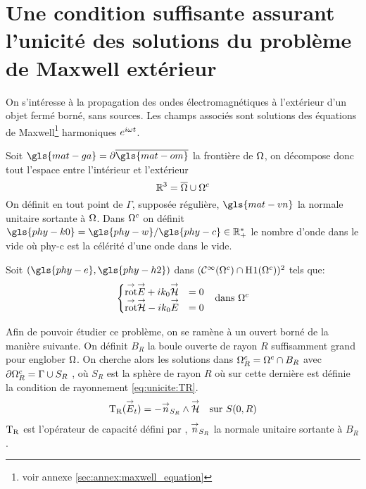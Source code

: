 \section[Une CSU des solutions du problème de Maxwell extérieur]{Une condition suffisante assurant l'unicité des solutions du problème de Maxwell extérieur}

  On s’intéresse à la propagation des ondes électromagnétiques à l'extérieur d'un objet fermé borné, sans sources. Les champs associés sont solutions des équations de Maxwell\footnote{voir annexe \ref{sec:annex:maxwell_equation}} harmoniques \(e^{i\w t}\).

  Soit \(\gls{mat-ga}=\partial\overline{\gls{mat-om}}\) la frontière de \(\OO\), on décompose donc tout l'espace entre l'intérieur et l'extérieur 
  \[
    \RR^3 = \overline{\OO}\cup{\OO}^c
  \]
  On définit en tout point de \(\Gamma\), supposée régulière, \(\gls{mat-vn}\) la normale unitaire sortante à \(\OO\).
  Dans \(\OO^c\) on définit \(\gls{phy-k0}=\gls{phy-w} / \gls{phy-c} \in \RR_+^*\) le nombre d'onde dans le vide où \gls{phy-c} est la célérité d'une onde dans le vide.

  Soit \((\gls{phy-e},\gls{phy-h2})\) dans \((\mathcal{C}^\infty(\OO^c)\cap\Sobolev[1](\OO^c))^2\) tels que:
  \begin{align}
  \left\lbrace
    \begin{matrix}
      \trot \vE + i k_0 \vH &= 0
      \\
      \trot \vH - i k_0 \vE &= 0
    \end{matrix}
    \right. && \text{dans \(\OO^c\)}
    \label{eq:unicite:maxwell_ext}
  \end{align}


  Afin de pouvoir étudier ce problème, on se ramène à un ouvert borné de la manière suivante. On définit \(B_R\) la boule ouverte de rayon \(R\) suffisamment grand pour englober \(\OO\). On cherche alors les solutions dans \(\OO^c_R=\OO^c\cap B_R\) avec \(\partial\OO^c_R = \Gamma\cup S_R\) , où \(S_R\) est la sphère de rayon \(R\) où sur cette dernière est définie la condition de rayonnement \eqref{eq:unicite:TR}.
  \begin{equation}
    \label{eq:unicite:TR}
    \begin{aligned}
    \Tr(\vE_t) = - \vn_{S_R} \pvect \vH && \text{sur \(S(0,R)\)}
    \end{aligned}
  \end{equation}
  \(\Tr\) est l'opérateur de capacité défini par \cite[p.~200]{nedelec_acoustic_2001}, \(\vn_{S_R}\) la normale unitaire sortante à \(B_R\).

